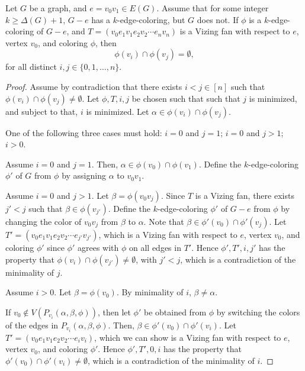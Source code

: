 \begin{lemma} \label{lem:vizing-fan-disjoint-colors}
    Let \(G\) be a graph, and \(e = v_0v_1 \in E(G)\).
    Assume that for some integer \(k \geq \Delta(G) + 1\),
    \(G - e\) has a \(k\)-edge-coloring, but \(G\) does not.
    If \(\phi\) is a \(k\)-edge-coloring of \(G - e\),
    and \(T = (v_0e_1v_1e_2v_2 \cdots e_nv_n)\) is a Vizing fan
    with respect to \(e\), vertex \(v_0\), and coloring \(\phi\),
    then
    \begin{equation}
        \phi(v_i) \cap \phi(v_j) = \emptyset,
    \end{equation}
    for all distinct \(i, j \in \{0, 1, \ldots, n\}\).
\end{lemma}

\begin{proof}
    Assume by contradiction that there exists \(i < j \in [n]\) such that \(\phi(v_i) \cap \phi(v_j) \neq \emptyset\).
    Let \(\phi, T, i, j\) be chosen such that such that
    \(j\) is minimized, and subject to that,
    \(i\) is minimized.
    Let \(\alpha \in \phi(v_i) \cap \phi(v_j)\).

    One of the following three cases must hold:
    \(i = 0\) and \(j = 1\);
    \(i = 0\) and \(j > 1\);
    \(i > 0\).

    Assume \(i = 0\) and \(j = 1\).
    Then, \(\alpha \in \phi(v_0) \cap \phi(v_1)\).
    Define the \(k\)-edge-coloring \(\phi'\) of \(G\)
    from \(\phi\) by
    assigning \(\alpha\) to \(v_0v_1\).

    Assume \(i = 0\) and \(j > 1\).
    Let \(\beta = \phi(v_0v_j)\).
    Since \(T\) is a Vizing fan, there exists \(j' < j\) such that \(\beta \in \phi(v_{j'})\).
    Define the \(k\)-edge-coloring \(\phi'\) of \(G - e\)
    from \(\phi\) by
    changing the color of \(v_0v_j\) from \(\beta\) to \(\alpha\).
    Note that \(\beta \in \phi'(v_0) \cap \phi'(v_j)\).
    Let \(T' = (v_0e_1v_1e_2v_2 \cdots e_{j'}v_{j'})\),
    which is a Vizing fan with respect to \(e\), vertex \(v_0\), and coloring \(\phi'\)
    since \(\phi'\) agrees with \(\phi\) on all edges in \(T'\).
    Hence \(\phi', T', i, j'\) has the property that \(\phi(v_i) \cap \phi(v_{j'}) \neq \emptyset\), with \(j' < j\), which is a contradiction of the minimality of \(j\).

    Assume \(i > 0\).
    Let \(\beta = \phi(v_0)\).
    By minimality of \(i\), \(\beta \neq \alpha\).

    If \(v_0 \notin V(P_{v_i}(\alpha, \beta, \phi))\),
    then let \(\phi'\) be obtained from \(\phi\) by
    switching the colors of the edges in \(P_{v_i}(\alpha, \beta, \phi)\).
    Then, \(\beta \in \phi'(v_0) \cap \phi'(v_i)\).
    Let \(T' = (v_0e_1v_1e_2v_2 \cdots e_iv_i)\),
    which we can show is a Vizing fan with respect to \(e\), vertex \(v_0\), and coloring \(\phi'\).
    Hence \(\phi', T', 0, i\) has the property that \(\phi'(v_0) \cap \phi'(v_i) \neq \emptyset\), which is a contradiction of the minimality of \(i\).


\end{proof}
